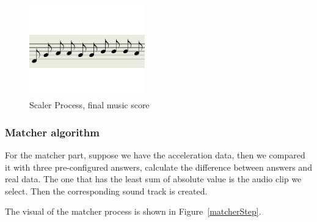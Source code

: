 \begin{figure}[H]
\centering
\newcommand{\widthOfScalerStepFigure}{5cm}
\includegraphics[width=\widthOfScalerStepFigure]{figWR/scaler2}
\caption{Scaler Process, final music score}
\label{scalerStep2}
\end{figure}


\subsubsection{Matcher algorithm}

   For the matcher part, suppose we have the acceleration data,
   then we compared it with three pre-configured answers,
   calculate the difference between answers and real data.
   The one that has the least sum of absolute value is the audio clip we select.
   Then the corresponding sound track is created.

   The visual of the matcher process is shown in Figure~\ref{matcherStep}.

